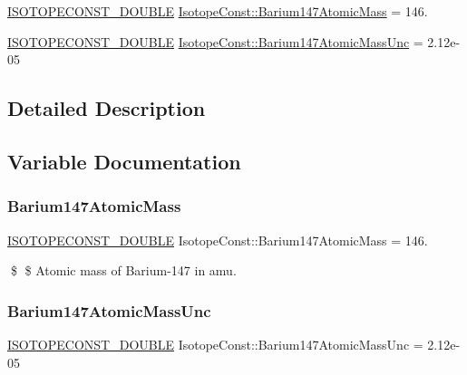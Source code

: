 \begin{DoxyCompactItemize}
\item 
\mbox{\hyperlink{group___isotope_const-_macros_ga8f45a7272ce02c0b4c65c44636ed719a}{I\+S\+O\+T\+O\+P\+E\+C\+O\+N\+S\+T\+\_\+\+D\+O\+U\+B\+LE}} \mbox{\hyperlink{group___isotope_const-_barium-_ba147_gaa2931e346e7c4b75276699fe19b10376}{Isotope\+Const\+::\+Barium147\+Atomic\+Mass}} = 146.
\item 
\mbox{\hyperlink{group___isotope_const-_macros_ga8f45a7272ce02c0b4c65c44636ed719a}{I\+S\+O\+T\+O\+P\+E\+C\+O\+N\+S\+T\+\_\+\+D\+O\+U\+B\+LE}} \mbox{\hyperlink{group___isotope_const-_barium-_ba147_gaeb9f49fc053fe0f5036bc2f9f5432326}{Isotope\+Const\+::\+Barium147\+Atomic\+Mass\+Unc}} = 2.\+12e-\/05
\end{DoxyCompactItemize}


\subsection{Detailed Description}


\subsection{Variable Documentation}
\mbox{\label{group___isotope_const-_barium-_ba147_gaa2931e346e7c4b75276699fe19b10376}} 
\subsubsection{\texorpdfstring{Barium147\+Atomic\+Mass}{Barium147AtomicMass}}
{\footnotesize\ttfamily \mbox{\hyperlink{group___isotope_const-_macros_ga8f45a7272ce02c0b4c65c44636ed719a}{I\+S\+O\+T\+O\+P\+E\+C\+O\+N\+S\+T\+\_\+\+D\+O\+U\+B\+LE}} Isotope\+Const\+::\+Barium147\+Atomic\+Mass = 146.}

\$ \$ Atomic mass of Barium-\/147 in amu. \mbox{\label{group___isotope_const-_barium-_ba147_gaeb9f49fc053fe0f5036bc2f9f5432326}} 
\subsubsection{\texorpdfstring{Barium147\+Atomic\+Mass\+Unc}{Barium147AtomicMassUnc}}
{\footnotesize\ttfamily \mbox{\hyperlink{group___isotope_const-_macros_ga8f45a7272ce02c0b4c65c44636ed719a}{I\+S\+O\+T\+O\+P\+E\+C\+O\+N\+S\+T\+\_\+\+D\+O\+U\+B\+LE}} Isotope\+Const\+::\+Barium147\+Atomic\+Mass\+Unc = 2.\+12e-\/05}

